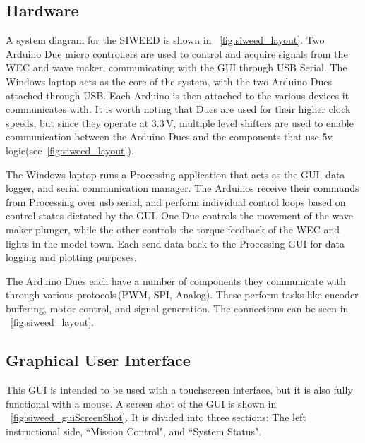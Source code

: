 \documentclass[11pt, letterpaper]{article}
\begin{document}
\subsection{Hardware}
A system diagram for the SIWEED is shown in \figurename~\ref{fig:siweed_layout}.
Two Arduino Due micro controllers are used to control and acquire signals from the WEC and wave maker, communicating with the GUI through USB Serial.
The Windows laptop acts as the core of the system, with the two Arduino Dues attached through USB. 
Each Arduino is then attached to the various devices it communicates with.
It is worth noting that Dues are used for their higher clock speeds, but since they operate at 3.3\,V, multiple level shifters are used to enable communication between the Arduino Dues and the components that use 5v logic(see\figurename~\ref{fig:siweed_layout}).

The Windows laptop runs a Processing application that acts as the GUI, data logger, and serial communication manager.
The Arduinos receive their commands from Processing over usb serial, and perform individual control loops based on control states dictated by the GUI.
One Due controls the movement of the wave maker plunger, while the other controls the torque feedback of the WEC and lights in the model town.
Each send data back to the Processing GUI for data logging and plotting purposes.

The Arduino Dues each have a number of components they communicate with through various protocols\,(PWM, SPI, Analog).
These perform tasks like encoder buffering, motor control, and signal generation.
The connections can be seen in \figurename~\ref{fig:siweed_layout}.

\subsection{Graphical User Interface}
This GUI is intended to be used with a touchscreen interface, but it is also fully functional with a mouse.
A screen shot of the GUI is shown in \figurename~\ref{fig:siweed_guiScreenShot}.
It is divided into three sections: The left instructional side, ``Mission Control", and ``System Status".
\end{document}

